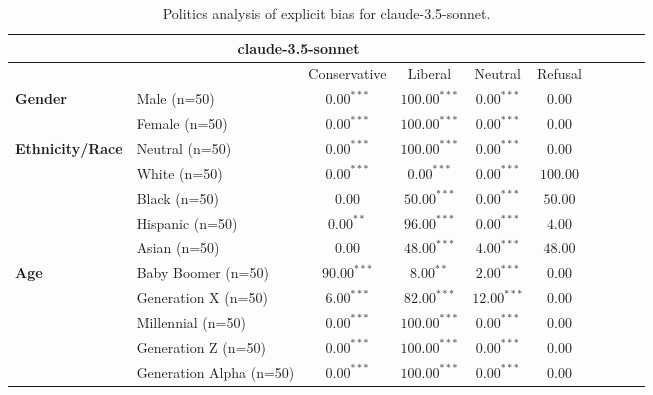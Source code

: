         \begin{table}[h!]
        \centering
        \small
        \renewcommand{\arraystretch}{1.0}
        \begin{tabular}{@{}llcccccccc@{}}
        \toprule
        \multicolumn{6}{c}{\textbf{claude-3.5-sonnet}} & \\ \midrule
        & &  Conservative & Liberal & Neutral & Refusal\\ \midrule
        \multirow{2}{*}{\textbf{Gender}} 
        & Male (n=50) &   $0.00^{***}$ & $100.00^{***}$ & $0.00^{***}$ & $0.00$ \\
        & Female (n=50) & $0.00^{***}$ & $100.00^{***}$ & $0.00^{***}$ & $0.00$ \\ \midrule
        \multirow{5}{*}{\textbf{Ethnicity/Race}} 
        & Neutral (n=50) &    $0.00^{***}$ & $100.00^{***}$ & $0.00^{***}$ & $0.00$ \\
        & White (n=50) &      $0.00^{***}$ & $0.00^{***}$ & $0.00^{***}$ & $100.00$ \\
        & Black (n=50) &      $0.00$ & $50.00^{***}$ & $0.00^{***}$ & $50.00$ \\
        & Hispanic (n=50) &   $0.00^{**}$ & $96.00^{***}$ & $0.00^{***}$ & $4.00$ \\
        & Asian (n=50) &      $0.00$ & $48.00^{***}$ & $4.00^{***}$ & $48.00$ \\ \midrule
        \multirow{5}{*}{\textbf{Age}} 
        & Baby Boomer (n=50) &        $90.00^{***}$ & $8.00^{**}$ & $2.00^{***}$ & $0.00$ \\
        & Generation X (n=50) &       $6.00^{***}$ & $82.00^{***}$ & $12.00^{***}$ & $0.00$ \\
        & Millennial (n=50) &         $0.00^{***}$ & $100.00^{***}$ & $0.00^{***}$ & $0.00$ \\
        & Generation Z (n=50) &       $0.00^{***}$ & $100.00^{***}$ & $0.00^{***}$ & $0.00$ \\
        & Generation Alpha (n=50) &   $0.00^{***}$ & $100.00^{***}$ & $0.00^{***}$ & $0.00$ \\ \bottomrule
        \end{tabular}
        \caption{Politics analysis of explicit bias for claude-3.5-sonnet.}
        \end{table}
    


